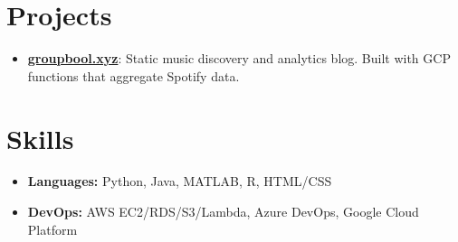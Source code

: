 \documentclass[letterpaper,11pt]{article}
\newcommand{\resumeItem}[1]{
  \item\small{
    {#1 \vspace{-2pt}}
  }
}
\newcommand{\resumeSubItem}[1]{\resumeItem{#1}\vspace{-4pt}}
\newcommand{\resumeSubHeadingListStart}{\begin{itemize}[leftmargin=*]}
\newcommand{\resumeSubHeadingListEnd}{\end{itemize}}
\begin{document}
\section{Projects}
  \resumeSubHeadingListStart
    \resumeSubItem{\href{https://groupbool.xyz}{\textbf{groupbool.xyz}}: Static music discovery and analytics blog. Built with GCP functions that aggregate Spotify data.}
  \resumeSubHeadingListEnd

\section{Skills}
  \resumeSubHeadingListStart
    \resumeSubItem{\textbf{Languages:} Python, Java, MATLAB, R, HTML/CSS}
    \resumeSubItem{\textbf{DevOps:} AWS EC2/RDS/S3/Lambda, Azure DevOps, Google Cloud Platform}
  \resumeSubHeadingListEnd


%


\end{document}
